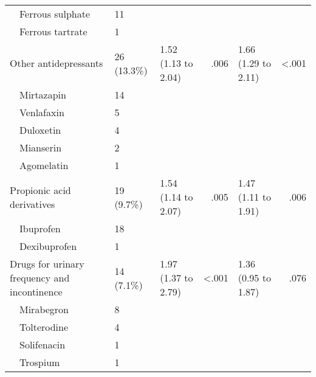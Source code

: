 \begin{table}[]
\begin{tabular}{p{7em}llrlr}
~~Ferrous sulphate                           & 11          &                             &         &                           &                \\
~~Ferrous tartrate                           & 1           &                             &         &                           &                \\
Other antidepressants                      & 26 (13.3\%) & 1.52 (1.13 to 2.04)         & .006    & 1.66 (1.29 to 2.11)       & \textless .001 \\
~~Mirtazapin                                 & 14          &                             &         &                           &                \\
~~Venlafaxin                                 & 5           &                             &         &                           &                \\
~~Duloxetin                                  & 4           &                             &         &                           &                \\
~~Mianserin                                  & 2           &                             &         &                           &                \\
~~Agomelatin                                 & 1           &                             &         &                           &                \\
Propionic acid derivatives                 & 19 (9.7\%)  & 1.54 (1.14 to 2.07)         & .005    & 1.47 (1.11 to 1.91)       & .006           \\
~~Ibuprofen                                  & 18          &                             &         &                           &                \\
~~Dexibuprofen                               & 1           &                             &         &                           &                \\
Drugs for urinary frequency and   incontinence &
  14 (7.1\%) &
  1.97 (1.37 to 2.79) &
  \textless{}.001 &
  1.36 (0.95 to 1.87) &
  .076 \\
~~Mirabegron                                 & 8           &                             &         &                           &                \\
~~Tolterodine                                & 4           &                             &         &                           &                \\
~~Solifenacin                                & 1           &                             &         &                           &                \\
~~Trospium                                   & 1           &                             &         &                           &                \\ \bottomrule
\end{tabular}
\end{table}